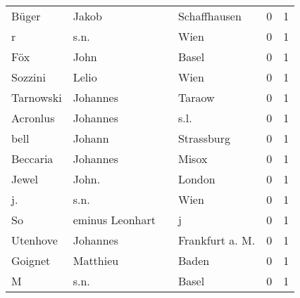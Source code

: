 \begin{tabular}{llllrr}
                    Büger &                              Jakob &             &                                Schaffhausen &          0 &         1 \\
                        r &                               s.n. &             &                                        Wien &          0 &         1 \\
                      Föx &                               John &             &                                       Basel &          0 &         1 \\
                  Sozzini &                              Lelio &             &                                        Wien &          0 &         1 \\
                Tarnowski &                           Johannes &             &                                      Taraow &          0 &         1 \\
                 Acronlus &                           Johannes &             &                                        s.l. &          0 &         1 \\
                     bell &                             Johann &             &                                  Strassburg &          0 &         1 \\
                 Beccaria &                           Johannes &             &                                       Misox &          0 &         1 \\
                    Jewel &                              John. &             &                                      London &          0 &         1 \\
                       j. &                               s.n. &             &                                        Wien &          0 &         1 \\
                       So &                    eminus Leonhart &             &                                           j &          0 &         1 \\
                 Utenhove &                           Johannes &             &                            Frankfurt a. M.  &          0 &         1 \\
                  Goignet &                           Matthieu &             &                                       Baden &          0 &         1 \\
                        M &                               s.n. &             &                                       Basel &          0 &         1 \\

\end{tabular}
